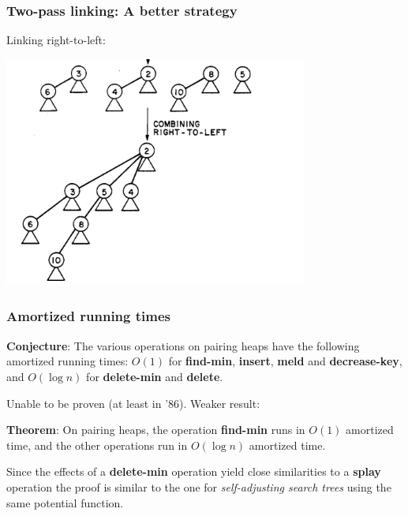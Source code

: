 \documentclass{beamer}
\begin{document}
\begin{frame}
\frametitle{Two-pass linking: A better strategy}

Linking right-to-left:

\includegraphics[width=10cm]{fig6-2.png}

\end{frame}

\begin{frame}
\frametitle{Amortized running times}

\textbf{Conjecture}: The various operations on pairing heaps have the following
amortized running times: $O(1)$ for \textbf{find-min}, \textbf{insert},
\textbf{meld} and \textbf{decrease-key}, and $O(\log n)$ for \textbf{delete-min}
and \textbf{delete}.

\vspace{\baselineskip}

Unable to be proven (at least in '86). Weaker result:

\vspace{\baselineskip}

\textbf{Theorem}: On pairing heaps, the operation \textbf{find-min} runs in
$O(1)$ amortized time, and the other operations run in $O(\log n)$ amortized
time.

\vspace{\baselineskip}

Since the effects of a \textbf{delete-min} operation yield close similarities to
a \textbf{splay} operation the proof is similar to the one for
\emph{self-adjusting search trees} using the same potential function.

\end{frame}
\end{document}
